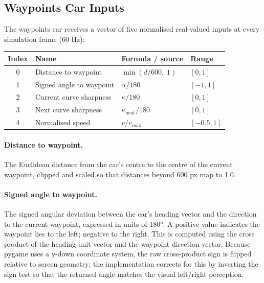 \documentclass[a4paper]{article}
\begin{document}
\subsection{Waypoints Car Inputs}
\label{subsec:waypoints-car-inputs}

The waypoints car receives a vector of five normalised real-valued inputs at every
simulation frame (60 Hz):

\begin{center}
\begin{tabular}{clll}
\toprule
\textbf{Index} & \textbf{Name} & \textbf{Formula / source} & \textbf{Range} \\ \midrule
0 & Distance to waypoint      & $\min(d / 600,\; 1)$         & $[0,1]$   \\
1 & Signed angle to waypoint  & $\alpha / 180$                & $[-1,1]$  \\
2 & Current curve sharpness   & $\kappa / 180$                & $[0,1]$   \\
3 & Next curve sharpness      & $\kappa_{\text{next}} / 180$  & $[0,1]$   \\
4 & Normalised speed          & $v / v_{\max}$                & $[-0.5,1]$\\
\bottomrule
\end{tabular}
\end{center}

\paragraph{Distance to waypoint.}
The Euclidean distance from the car's centre to the centre of the current waypoint,
clipped and scaled so that distances beyond 600 px map to 1.0.

\paragraph{Signed angle to waypoint.}
The signed angular deviation between the car's heading vector and the direction to the
current waypoint, expressed in units of 180°.
A positive value indicates the waypoint lies to the left; negative to the right.
This is computed using the cross product of the heading unit vector and the
waypoint direction vector.
Because pygame uses a y-down coordinate system, the raw cross-product sign is
flipped relative to screen geometry; the implementation corrects for this by
inverting the sign test so that the returned angle matches the visual left/right
perception.
\end{document}
